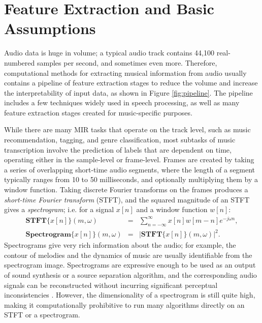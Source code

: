 \section{Feature Extraction and Basic Assumptions}

Audio data is huge in volume; a typical audio track contains 44,100 real-numbered samples per second, and sometimes even more.
Therefore, computational methods for extracting musical information from audio usually contains a pipeline of feature extraction stages to reduce the volume and increase the interpretability of input data, as shown in Figure \ref{fig:pipeline}.
The pipeline includes a few techniques widely used in speech processing, as well as many feature extraction stages created for music-specific purposes.


While there are many MIR tasks that operate on the track level, such as music recommendation, tagging, and genre classification, most subtasks of music transcription involve the prediction of labels that are dependent on time, operating either in the sample-level or frame-level.
Frames are created by taking a series of overlapping short-time audio segments, where the length of a segment typically ranges from 10 to 50 milliseconds, and optionally multiplying them by a window function.
Taking discrete Fourier transforms on the frames produces a \emph{short-time Fourier transform} (STFT), and the squared magnitude of an STFT gives a \emph{spectrogram}; 
i.e. for a signal $x[n]$ and a window function $w[n]$:
\begin{eqnarray}
\textbf{STFT}\{x[n]\}(m, \omega) & = & \sum_{n = -\infty}^{\infty} x[n] w[m-n] e^{-j \omega n}, \\
\textbf{Spectrogram}\{x[n]\}(m, \omega) & = & \big | \textbf{STFT}\{x[n]\}(m, \omega) \big |^2.
\end{eqnarray}
Spectrograms give very rich information about the audio; for example, the contour of melodies and the dynamics of music are usually identifiable from the spectrogram image.
Spectrograms are expressive enough to be used as an output of sound synthesis or a source separation algorithm, and the corresponding audio signals can be reconstructed without incurring significant perceptual inconsistencies \cite{griffin1984lim, leroux2010spectrogram}.
However, the dimensionality of a spectrogram is still quite high, making it computationally prohibitive to run many algorithms directly on an STFT or a spectrogram.

